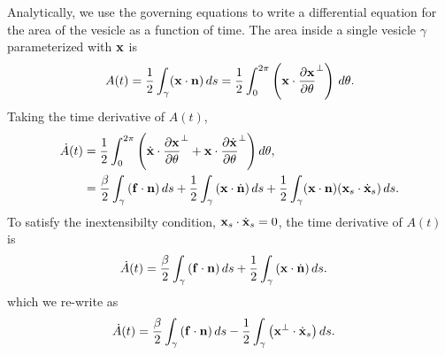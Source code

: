 \documentclass[twoside,twocolumn,9pt]{article}
\begin{document}
Analytically, we use the governing equations to write a differential equation for
the area of the vesicle as a function of time. The area inside a single
vesicle $\gamma$ parameterized with $\mathbf{x}$ is
\begin{align}
A(t) = \frac{1}{2}\int_{\gamma} (\mathbf{x} \cdot \mathbf{n})\, ds = 
\frac{1}{2}\int_{0}^{2\pi} \left(\mathbf{x} \cdot
\frac{\partial \mathbf{x}}{\partial \theta}^\perp\right)
\, d\theta.
\end{align}
Taking the time derivative of $A(t)$,
\begin{align}
\dot{A}(t) &= \frac{1}{2}\int_{0}^{2\pi} \left(\dot{\mathbf{x}} \cdot
\frac{\partial \mathbf{x}}{\partial \theta}^{\perp} + 
\mathbf{x} \cdot \frac{\partial \dot{\mathbf{x}}}{\partial \theta}^{\perp}\right) d\theta, \\
&= \frac{\beta}{2} \int_{\gamma}\left(\mathbf{f}\cdot\mathbf{n}\right)ds + \frac{1}{2}
\int_{\gamma}\left(\mathbf{x}\cdot\dot{\mathbf{n}}\right)ds + \frac{1}{2}\int_{\gamma}
(\mathbf{x}\cdot\mathbf{n}) (\mathbf{x}_s \cdot \dot{\mathbf{x}}_s)\, ds.
\end{align}
To satisfy the inextensibilty condition, $\mathbf{x}_s \cdot \dot{\mathbf{x}}_s = 0$, the time derivative of $A(t)$ is
\begin{align}
\dot{A}(t) &= \frac{\beta}{2}
\int_{\gamma}\left(\mathbf{f}\cdot\mathbf{n}\right)ds
+ \frac{1}{2} \int_{\gamma}\left(\mathbf{x}\cdot\dot{\mathbf{n}}\right)ds.
\end{align}
which we re-write as
\begin{align}
\dot{A}(t) &= \frac{\beta}{2}
\int_{\gamma}\left(\mathbf{f}\cdot\mathbf{n}\right)ds-\frac{1}{2}\int_{\gamma}\left(\mathbf{x}^{\perp}\cdot\dot{\mathbf{x}}_s\right) ds.
\end{align}
\end{document}
